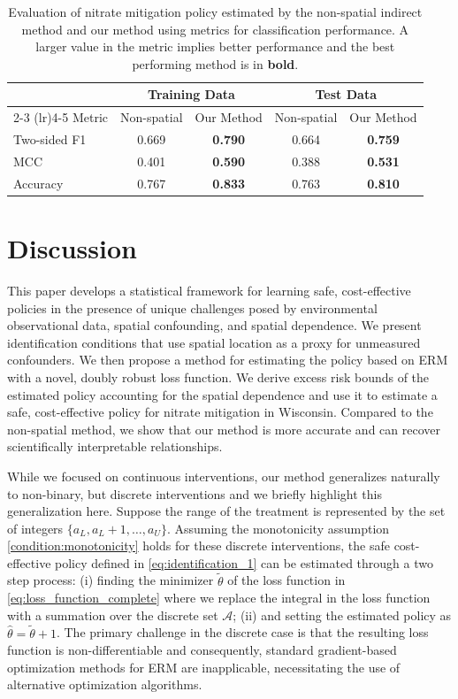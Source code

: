 \documentclass[12pt]{article}
\begin{document}
\begin{table}[htbp]
    \centering
    \caption{Evaluation of nitrate mitigation policy estimated by the non-spatial indirect method and our method using metrics for classification performance. A larger value in the metric implies better performance and the best performing method is in \textbf{bold}.}
    \label{tab:model_performance}
    \begin{tabular}{l cc cc}
        \toprule
        & \multicolumn{2}{c}{{Training Data}} & \multicolumn{2}{c}{{Test Data}} \\
        \cmidrule(lr){2-3} \cmidrule(lr){4-5}
        {Metric} & Non-spatial & Our Method & Non-spatial & Our Method \\
        \midrule
        Two-sided F1 & 0.669 & \textbf{0.790} & 0.664 & \textbf{0.759} \\
        MCC          & 0.401 & \textbf{0.590} & 0.388 & \textbf{0.531} \\
        Accuracy     & 0.767 & \textbf{0.833} & 0.763 & \textbf{0.810} \\
        \bottomrule
    \end{tabular}
\end{table}
\section{Discussion}\label{sec: discussion}
This paper develops a statistical framework for learning safe, cost-effective policies in the presence of unique challenges posed by environmental observational data, spatial confounding, and spatial dependence. We present identification conditions that use spatial location as a proxy for unmeasured confounders. We then propose a method for estimating the policy based on ERM with a novel, doubly robust loss function. We derive excess risk bounds of the estimated policy accounting for the spatial dependence and use it to estimate a safe, cost-effective policy for nitrate mitigation in Wisconsin. Compared to the non-spatial method, we show that our method is more accurate and can recover scientifically interpretable relationships.

While we focused on continuous interventions, our method generalizes naturally to non-binary, but discrete interventions and we briefly highlight this generalization here. Suppose the range of the treatment is represented by the set of integers $\{a_L,a_L +1,\ldots,a_U\}$. Assuming the monotonicity assumption \ref{condition:monotonicity} holds for these discrete interventions, the safe cost-effective policy defined in \eqref{eq:identification_1} can be estimated through a two step process: (i) finding the minimizer $\tilde\theta$ of the loss function in \eqref{eq:loss_function_complete} where we replace the integral in the loss function with a summation over the discrete set $\mathcal{A}$; (ii) and setting the estimated policy as $\hat\theta = \tilde \theta + 1$. The primary challenge in the discrete case is that the resulting loss function is non-differentiable and consequently, standard gradient-based optimization methods for ERM are inapplicable, necessitating the use of alternative optimization algorithms.
\end{document}

